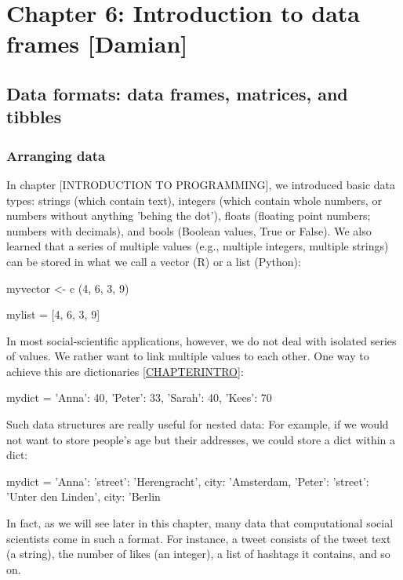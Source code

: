 \chapter{Chapter 6: Introduction to data frames [Damian]}

\section{Data formats: data frames, matrices, and tibbles}

\subsection{Arranging data}

In chapter [INTRODUCTION TO PROGRAMMING], we introduced basic data types: strings (which contain text), integers (which contain whole numbers, or numbers without anything 'behing the dot'), floats (floating point numbers; numbers with decimals), and bools (Boolean values, True or False). 
We also learned that a series of multiple values (e.g., multiple integers, multiple strings) can be stored in what we call a vector (R) or a list (Python):
\begin{exampler}
myvector <- c (4, 6, 3, 9)
\end{exampler}

\begin{examplepy}
mylist = [4, 6, 3, 9]
\end{examplepy}

In most social-scientific applications, however, we do not deal with isolated series of values. We rather want to link multiple values to each other. One way to achieve this are dictionaries \ref{CHAPTERINTRO}:

\begin{examplepy}
mydict = {'Anna': 40, 'Peter': 33, 'Sarah': 40, 'Kees': 70}
\end{examplepy}

Such data structures are really useful for nested data: For example, if we would not want to store people's age but their addresses, we could store a dict within a dict:

\begin{examplepy}
mydict = {'Anna': {'street': 'Herengracht', city: 'Amsterdam}, 'Peter': {'street': 'Unter den Linden', city: 'Berlin} }
\end{examplepy}

In fact, as we will see later in this chapter, many data that computational social scientists come in such a format. For instance, a tweet consists of the tweet text (a string), the number of likes (an integer), a list of hashtags it contains, and so on.

